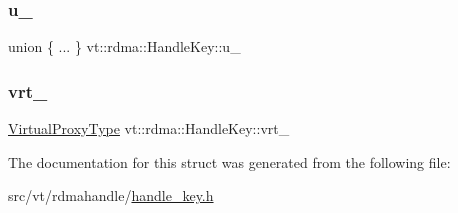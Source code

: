 \subsubsection{\texorpdfstring{u\+\_\+}{u\_}}
{\footnotesize\ttfamily union \{ ... \}   vt\+::rdma\+::\+Handle\+Key\+::u\+\_\+}

\mbox{\label{structvt_1_1rdma_1_1_handle_key_a8f7eb5fab7d65601e5a541797299bb83}} 
\subsubsection{\texorpdfstring{vrt\+\_\+}{vrt\_}}
{\footnotesize\ttfamily \hyperlink{namespacevt_a1b417dd5d684f045bb58a0ede70045ac}{Virtual\+Proxy\+Type} vt\+::rdma\+::\+Handle\+Key\+::vrt\+\_\+}



The documentation for this struct was generated from the following file\+:\begin{DoxyCompactItemize}
\item 
src/vt/rdmahandle/\hyperlink{handle__key_8h}{handle\+\_\+key.\+h}\end{DoxyCompactItemize}
